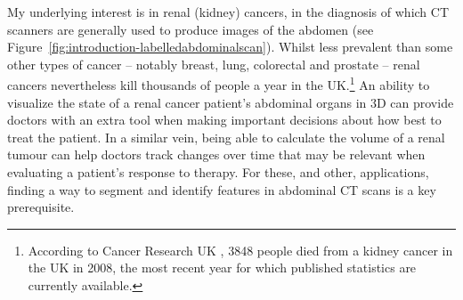 
My underlying interest is in renal (kidney) cancers, in the diagnosis of which CT scanners are generally used to produce images of the abdomen (see Figure~\ref{fig:introduction-labelledabdominalscan}). Whilst less prevalent than some other types of cancer -- notably breast, lung, colorectal and prostate -- renal cancers nevertheless kill thousands of people a year in the UK.\footnote{According to Cancer Research UK \cite{cruk-kidneycancermortality}, 3848 people died from a kidney cancer in the UK in 2008, the most recent year for which published statistics are currently available.} An ability to visualize the state of a renal cancer patient's abdominal organs in 3D can provide doctors with an extra tool when making important decisions about how best to treat the patient. In a similar vein, being able to calculate the volume of a renal tumour can help doctors track changes over time that may be relevant when evaluating a patient's response to therapy. For these, and other, applications, finding a way to segment and identify features in abdominal CT scans is a key prerequisite.


